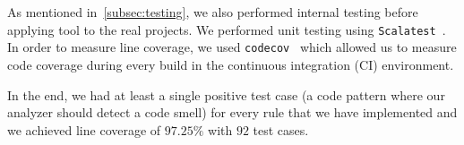 

As mentioned in~\ref{subsec:testing}, we also performed internal testing before applying tool to the real projects.
We performed unit testing using \verb|Scalatest|~\cite{scalatest}.
In order to measure line coverage, we used \verb|codecov|~\cite{codecov} which allowed us to measure
code coverage during every build in the continuous integration (CI) environment.

In the end, we had at least a single positive test case (a code pattern where our analyzer should detect a code smell)
for every rule that we have implemented and we achieved line coverage of $97.25\%$ with $92$ test cases.
